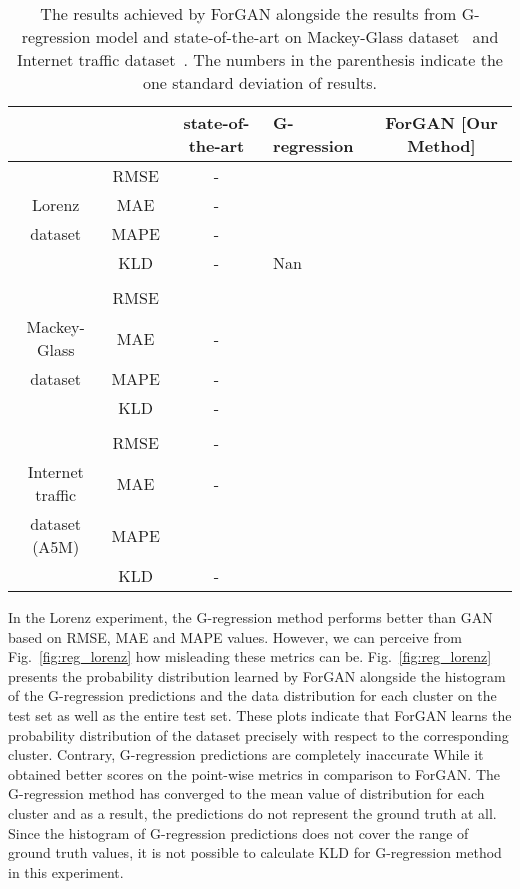 \documentclass{ieeeaccess}
\begin{document}
\begin{table*}
	\caption{The results achieved by ForGAN alongside the results from G-regression model and state-of-the-art on Mackey-Glass dataset~\cite{mendez2017competitive} and Internet traffic dataset~\cite{cortez2012multi}. The numbers in the parenthesis indicate the one standard deviation of results.}
	\label{tab:all_res}
	\small \centering
	\begin{tabular}{c|ccllcl}
		\toprule
		\multicolumn{2}{c}{ }& \textbf{state-of-the-art} &\textbf{G-regression} &\multicolumn{3}{c}{ForGAN [\textbf{Our Method}]}\\
		\midrule
		&RMSE	& -    &	&	 \\
		Lorenz	&MAE    & -    &	        &	 \\
		dataset &MAPE	& -    &	    & \\
		&KLD    & -    &Nan 	        &	     \\
		
		\multicolumn{2}{c}{ }\\
		
		&RMSE    &     &        &    \\
		Mackey-Glass &MAE     & -                      &        &    \\
		dataset      &MAPE    & -                      &    & \\
		&KLD     & -                      &        &    \\
		
		\multicolumn{2}{c}{ }\\
		
		&RMSE    & -          &  &  \\
		Internet traffic    &MAE     & -          &  &  \\
		dataset (A5M)       &MAPE    &  & &  \\
		&KLD     & -          &               & \\
		
		\bottomrule
	\end{tabular}
\end{table*}
\medskip

In the Lorenz experiment, the G-regression method performs better than GAN based on RMSE, MAE and MAPE values. However, we can perceive from Fig.~\ref{fig:reg_lorenz} how misleading these metrics can be. Fig.~\ref{fig:reg_lorenz} presents the probability distribution learned by ForGAN alongside the histogram of the G-regression predictions and the data distribution for each cluster on the test set as well as the entire test set. These plots indicate that ForGAN learns the probability distribution of the dataset precisely with respect to the corresponding cluster. Contrary, G-regression predictions are completely inaccurate While it obtained better scores on the point-wise metrics in comparison to ForGAN. The G-regression method has converged to the mean value of  distribution for each cluster and as a result, the predictions do not represent the ground truth at all. Since the histogram of G-regression predictions does not cover the range of ground truth values, it is not possible to calculate KLD for G-regression method in this experiment.
\end{document}
